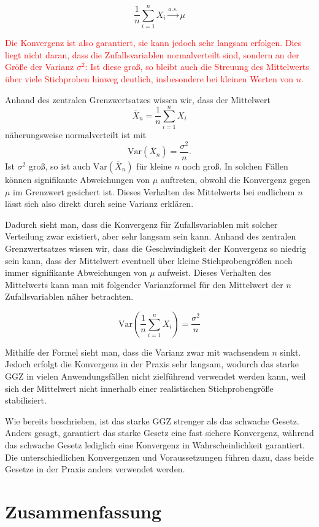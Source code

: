 \documentclass[aodsor,preprint]{imsart}
\numberwithin{equation}{section}
\theoremstyle{plain}
\begin{document}
\[
\frac{1}{n} \sum_{i=1}^n X_i \xrightarrow{a.s.} \mu
\]

\textcolor{red}{Die Konvergenz ist also garantiert, sie kann jedoch sehr langsam erfolgen.
Dies liegt nicht daran, dass die Zufallsvariablen normalverteilt sind, sondern an der Größe der Varianz \(\sigma^2\): Ist diese groß, so bleibt auch die Streuung des Mittelwerts über viele Stichproben hinweg deutlich, insbesondere bei kleinen Werten von \(n\).}

Anhand des zentralen Grenzwertsatzes wissen wir, dass der Mittelwert
\[
\bar{X}_n = \frac{1}{n} \sum_{i=1}^n X_i
\]
näherungsweise normalverteilt ist mit
\[
\text{Var}(\bar{X}_n) = \frac{\sigma^2}{n}.
\]
Ist \(\sigma^2\) groß, so ist auch \(\text{Var}(\bar{X}_n)\) für kleine \(n\) noch groß. In solchen Fällen können signifikante Abweichungen von \(\mu\) auftreten, obwohl die Konvergenz gegen \(\mu\) im Grenzwert gesichert ist. Dieses Verhalten des Mittelwerts bei endlichem \(n\) lässt sich also direkt durch seine Varianz erklären.


Dadurch sieht man, dass die Konvergenz für Zufallsvariablen mit solcher Verteilung zwar existiert, aber sehr langsam sein kann.
Anhand des zentralen Grenzwertsatzes wissen wir, dass die Geschwindigkeit der Konvergenz so niedrig sein kann, dass der Mittelwert eventuell über kleine Stichprobengrößen noch immer signifikante Abweichungen von \(\mu\) aufweist.
Dieses Verhalten des Mittelwerts kann man mit folgender Varianzformel für den Mittelwert der \(n\) Zufallsvariablen näher betrachten.

\[
\text{Var}\left( \frac{1}{n} \sum_{i=1}^n X_i \right) = \frac{\sigma^2}{n}
\]

Mithilfe der Formel sieht man, dass die Varianz zwar mit wachsendem \(n\) sinkt.
Jedoch erfolgt die Konvergenz in der Praxis sehr langsam, wodurch das starke GGZ in vielen Anwendungsfällen nicht zielführend verwendet werden kann, weil sich der Mittelwert nicht innerhalb einer realistischen Stichprobengröße stabilisiert.


Wie bereits beschrieben, ist das starke GGZ strenger als das schwache Gesetz.
Anders gesagt, garantiert das starke Gesetz eine fast sichere Konvergenz, während das schwache Gesetz lediglich eine Konvergenz in Wahrscheinlichkeit garantiert.
Die unterschiedlichen Konvergenzen und Voraussetzungen führen dazu, dass beide Gesetze in der Praxis anders verwendet werden.


\section{Zusammenfassung}
\label{sec:zusammenfassung}
\end{document}
